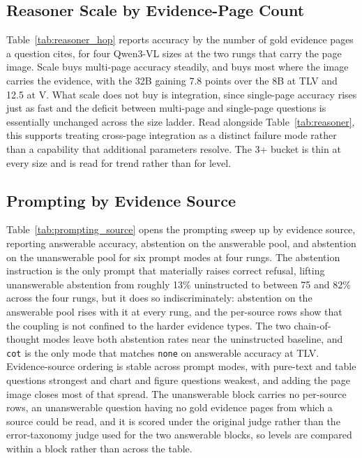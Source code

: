 \subsection{Reasoner Scale by Evidence-Page Count}
\label{app:reasoner_hop}
Table~\ref{tab:reasoner_hop} reports accuracy by the number of gold evidence pages a question cites, for four Qwen3-VL sizes at the two rungs that carry the page image. Scale buys multi-page accuracy steadily, and buys most where the image carries the evidence, with the 32B gaining 7.8 points over the 8B at TLV and 12.5 at V. What scale does not buy is integration, since single-page accuracy rises just as fast and the deficit between multi-page and single-page questions is essentially unchanged across the size ladder. Read alongside Table~\ref{tab:reasoner}, this supports treating cross-page integration as a distinct failure mode rather than a capability that additional parameters resolve. The 3+ bucket is thin at every size and is read for trend rather than for level.


\subsection{Prompting by Evidence Source}
\label{app:prompting_source}
Table~\ref{tab:prompting_source} opens the prompting sweep up by evidence source, reporting answerable accuracy, abstention on the answerable pool, and abstention on the unanswerable pool for six prompt modes at four rungs. The abstention instruction is the only prompt that materially raises correct refusal, lifting unanswerable abstention from roughly 13\% uninstructed to between 75 and 82\% across the four rungs, but it does so indiscriminately: abstention on the answerable pool rises with it at every rung, and the per-source rows show that the coupling is not confined to the harder evidence types. The two chain-of-thought modes leave both abstention rates near the uninstructed baseline, and \texttt{cot} is the only mode that matches \texttt{none} on answerable accuracy at TLV. Evidence-source ordering is stable across prompt modes, with pure-text and table questions strongest and chart and figure questions weakest, and adding the page image closes most of that spread. The unanswerable block carries no per-source rows, an unanswerable question having no gold evidence pages from which a source could be read, and it is scored under the original judge rather than the error-taxonomy judge used for the two answerable blocks, so levels are compared within a block rather than across the table.


